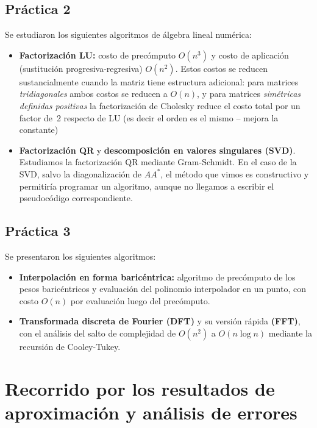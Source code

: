 \documentclass[12pt]{article}
\begin{document}
\subsection*{Práctica 2}

Se estudiaron los siguientes algoritmos de álgebra lineal numérica:

\begin{itemize}
  \item \textbf{Factorización LU:} costo de precómputo $O(n^3)$ y costo de aplicación (sustitución progresiva-regresiva) $O(n^2)$. Estos costos se reducen sustancialmente cuando la matriz tiene estructura adicional: para matrices \emph{tridiagonales} ambos costos se reducen a $O(n)$, y para matrices \emph{simétricas definidas positivas} la factorización de Cholesky reduce el costo total por un factor de~2 respecto de LU (es decir el orden es el mismo -- mejora la constante)
  \item \textbf{Factorización QR} y \textbf{descomposición en valores singulares (SVD)}. Estudiamos la factorización QR mediante Gram-Schmidt. En el caso de la SVD, salvo la diagonalización de $AA^*$, el método que vimos es constructivo y permitiría programar un algoritmo, aunque no llegamos a escribir el pseudocódigo correspondiente.
\end{itemize}

\subsection*{Práctica 3}

Se presentaron los siguientes algoritmos:

\begin{itemize}
  \item \textbf{Interpolación en forma baricéntrica:} algoritmo de precómputo de los pesos baricéntricos y evaluación del polinomio interpolador en un punto, con costo $O(n)$ por evaluación luego del precómputo.
  \item \textbf{Transformada discreta de Fourier (DFT)} y su versión rápida \textbf{(FFT)}, con el análisis del salto de complejidad de $O(n^2)$ a $O(n\log n)$ mediante la recursión de Cooley-Tukey.
\end{itemize}

\section*{Recorrido por los resultados de aproximación y análisis de errores}
\end{document}
